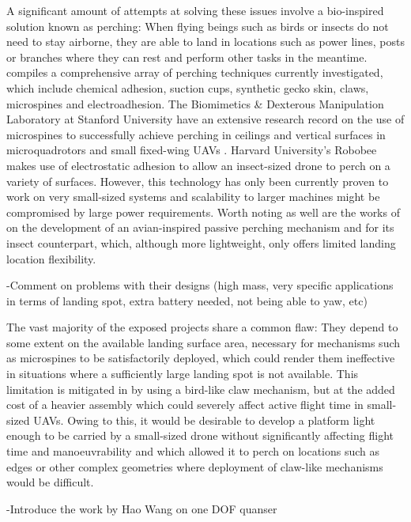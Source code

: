 \documentclass[12pt,a4paper]{article}
\begin{document}
A significant amount of attempts at solving these issues involve a bio-inspired solution known as perching: When flying beings such as birds or insects do not need to stay airborne, they are able to land in locations such as power lines, posts or branches where they can rest and perform other tasks in the meantime. \cite{PerchTypes} compiles a comprehensive array of perching techniques currently investigated, which include chemical adhesion, suction cups, synthetic gecko skin, claws, microspines and electroadhesion.  The Biomimetics \& Dexterous Manipulation Laboratory at Stanford University have an extensive research record on the use of microspines to successfully achieve perching in ceilings and vertical surfaces in microquadrotors \cite{SCAMP} and small fixed-wing UAVs \cite{microspines}. Harvard University's Robobee \cite{robobee} makes use of electrostatic adhesion to allow an insect-sized drone to perch on a variety of surfaces. However, this technology has only been currently proven to work on very small-sized systems and scalability to larger  machines might be compromised by large power requirements. Worth noting as well are the works of \cite{bird} on the development of an avian-inspired passive perching mechanism and \cite{insect} for its insect counterpart, which, although more lightweight, only offers limited landing location flexibility.


-Comment on problems with their designs (high mass, very specific applications in terms of landing spot, extra battery needed, not being able to yaw, etc)

The vast majority of the exposed projects share a common flaw: They depend to some extent on the available landing surface area, necessary for mechanisms such as microspines to be satisfactorily deployed, which could render them ineffective in situations where a sufficiently large landing spot is not available. This limitation is mitigated in \cite{bird} by using a bird-like claw mechanism, but at the added cost of a heavier assembly which could severely affect active flight time in small-sized UAVs. Owing to this, it would be desirable to develop a platform light enough to be carried by a small-sized drone without significantly affecting flight time and manoeuvrability and which allowed it to perch on locations such as edges or other complex geometries where deployment of claw-like mechanisms would be difficult.


-Introduce the work by Hao Wang on one DOF quanser
\end{document}
